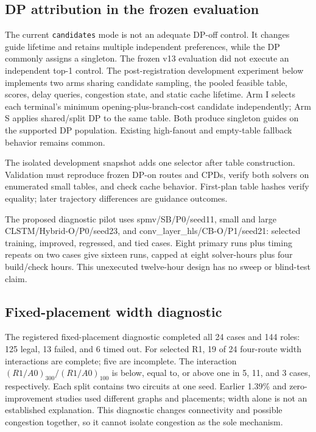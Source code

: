 \documentclass[conference,10pt]{IEEEtran}
\begin{document}
\subsection{DP attribution in the frozen evaluation}
The current \texttt{candidates} mode is not an adequate DP-off control. It changes guide lifetime and retains multiple independent preferences, while the DP commonly assigns a singleton. The frozen v13 evaluation did not execute an independent top-1 control. The post-registration development experiment below implements two arms sharing candidate sampling, the pooled feasible table, scores, delay queries, congestion state, and static cache lifetime. Arm I selects each terminal's minimum opening-plus-branch-cost candidate independently; Arm S applies shared/split DP to the same table. Both produce singleton guides on the supported DP population. Existing high-fanout and empty-table fallback behavior remains common.

The isolated development snapshot adds one selector after table construction. Validation must reproduce frozen DP-on routes and CPDs, verify both solvers on enumerated small tables, and check cache behavior. First-plan table hashes verify equality; later trajectory differences are guidance outcomes.

The proposed diagnostic pilot uses spmv/SB/P0/seed11, small and large CLSTM/Hybrid-O/P0/seed23, and conv\_layer\_hls/CB-O/P1/seed21: selected training, improved, regressed, and tied cases. Eight primary runs plus timing repeats on two cases give sixteen runs, capped at eight solver-hours plus four build/check hours. This unexecuted twelve-hour design has no sweep or blind-test claim.

\subsection{Fixed-placement width diagnostic}
The registered fixed-placement diagnostic completed all 24 cases and 144 roles: 125 legal, 13 failed, and 6 timed out. For selected R1, 19 of 24 four-route width interactions are complete; five are incomplete. The interaction $(R1/A0)_{300}/(R1/A0)_{100}$ is below, equal to, or above one in 5, 11, and 3 cases, respectively. Each split contains two circuits at one seed. Earlier 1.39\% and zero-improvement studies used different graphs and placements; width alone is not an established explanation. This diagnostic changes connectivity and possible congestion together, so it cannot isolate congestion as the sole mechanism.
\end{document}
